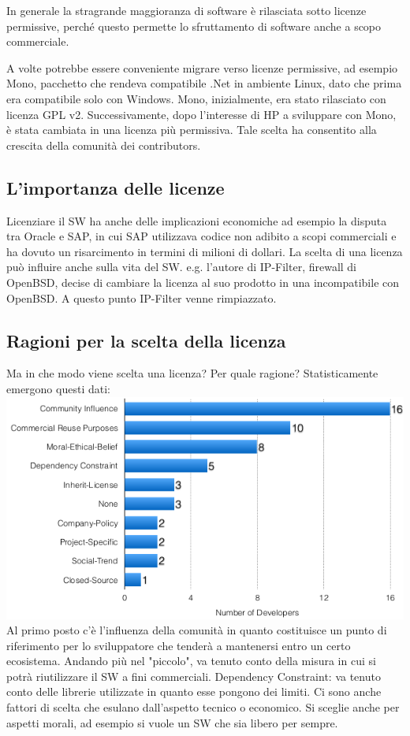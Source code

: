 \documentclass[10pt,a4paper]{book}
\begin{document}
In generale la stragrande maggioranza di software è rilasciata sotto licenze permissive, perché questo permette lo sfruttamento di software anche a scopo commerciale.

A volte potrebbe essere conveniente migrare verso licenze permissive, ad esempio Mono, pacchetto che rendeva compatibile .Net in ambiente Linux, dato che prima era compatibile solo con Windows.
Mono, inizialmente, era stato rilasciato con licenza GPL v2. Successivamente, dopo l'interesse di HP a sviluppare con Mono, è stata cambiata in una licenza più permissiva. Tale scelta ha consentito alla crescita della comunità dei contributors.

\subsection{L'importanza delle licenze}
Licenziare il SW ha anche delle implicazioni economiche ad esempio la disputa tra Oracle e SAP, in cui SAP utilizzava codice non adibito a scopi commerciali e ha dovuto un risarcimento in termini di milioni di dollari.
La scelta di una licenza può influire anche sulla vita del SW. e.g. l'autore di IP-Filter, firewall di OpenBSD, decise di cambiare la licenza al suo prodotto in una incompatibile con OpenBSD. A questo punto IP-Filter venne rimpiazzato.

\subsection{Ragioni per la scelta della licenza}
Ma in che modo viene scelta una licenza? Per quale ragione? 
Statisticamente emergono questi dati:\\
\includegraphics[scale=0.41]{lic2.png} \\
Al primo posto c'è l'influenza della comunità in quanto costituisce un punto di riferimento per lo sviluppatore che tenderà a mantenersi entro un certo ecosistema.
Andando più nel "piccolo", va tenuto conto della misura in cui si potrà riutilizzare il SW a fini commerciali.
Dependency Constraint: va tenuto conto delle librerie utilizzate in quanto esse pongono dei limiti.
Ci sono anche fattori di scelta che esulano dall'aspetto tecnico o economico.
Si sceglie anche per aspetti morali, ad esempio si vuole un SW che sia libero per sempre.
\end{document}
